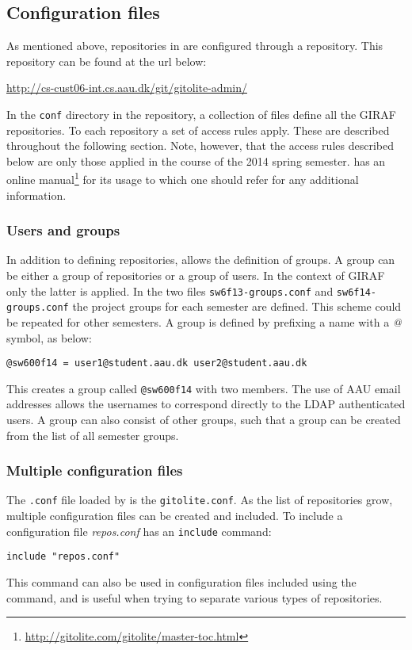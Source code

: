 \subsection{Configuration files}\label{git:gitolite:config}
As mentioned above, repositories in \gitolite{} are configured through a \git{} repository.
This repository can be found at the url below:
\begin{center}
\url{http://cs-cust06-int.cs.aau.dk/git/gitolite-admin/}
\end{center}
In the \texttt{conf} directory in the repository, a collection of files define all the GIRAF repositories.
To each repository a set of access rules apply.
These are described throughout the following section.
Note, however, that the access rules described below are only those applied in the course of the 2014 spring semester.
\Gitolite{} has an online manual\footnote{\url{http://gitolite.com/gitolite/master-toc.html}} for its usage to which one should refer for any additional information.

\subsubsection{Users and groups}
In addition to defining repositories, \gitolite{} allows the definition of groups.
A group can be either a group of repositories or a group of users.
In the context of GIRAF only the latter is applied.
In the two files \texttt{sw6f13-groups.conf} and \texttt{sw6f14-groups.conf} the project groups for each semester are defined.
This scheme could be repeated for other semesters.
A group is defined by prefixing a name with a \textit{@} symbol, as below:
\begin{center}
\texttt{@sw600f14 = user1@student.aau.dk user2@student.aau.dk}
\end{center}
This creates a group called \texttt{@sw600f14} with two members.
The use of AAU email addresses allows the usernames to correspond directly to the LDAP authenticated users.
A group can also consist of other groups, such that a group can be created from the list of all semester groups.

\subsubsection{Multiple configuration files}
The \texttt{.conf} file loaded by \gitolite{} is the \texttt{gitolite.conf}.
As the list of repositories grow, multiple configuration files can be created and included.
To include a configuration file \textit{repos.conf} \gitolite{} has an \texttt{include} command:
\begin{center}
\texttt{include "repos.conf"}
\end{center}
This command can also be used in configuration files included using the command, and is useful when trying to separate various types of repositories.

